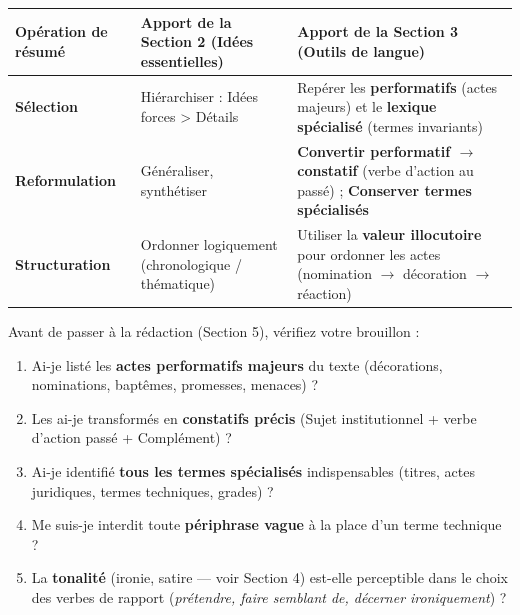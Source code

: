 \documentclass[11pt]{article}
\begin{document}
\begin{aretenir}
\begin{tabularx}{\linewidth}{|l|X|X|}
\hline
\rowcolor{popblueL} \textbf{Opération de résumé} & \textbf{Apport de la Section 2 (Idées essentielles)} & \textbf{Apport de la Section 3 (Outils de langue)} \\
\hline
\textbf{Sélection} & Hiérarchiser : Idées forces > Détails & Repérer les \textbf{performatifs} (actes majeurs) et le \textbf{lexique spécialisé} (termes invariants) \\
\hline
\textbf{Reformulation} & Généraliser, synthétiser & \textbf{Convertir performatif $\rightarrow$ constatif} (verbe d'action au passé) ; \textbf{Conserver termes spécialisés} \\
\hline
\textbf{Structuration} & Ordonner logiquement (chronologique / thématique) & Utiliser la \textbf{valeur illocutoire} pour ordonner les actes (nomination $\rightarrow$ décoration $\rightarrow$ réaction) \\
\hline
\end{tabularx}
\end{aretenir}

\begin{methode}
Avant de passer à la rédaction (Section 5), vérifiez votre brouillon :
\begin{enumerate}
    \item [$\square$] Ai-je listé les \textbf{actes performatifs majeurs} du texte (décorations, nominations, baptêmes, promesses, menaces) ?
    \item [$\square$] Les ai-je transformés en \textbf{constatifs précis} (Sujet institutionnel + verbe d'action passé + Complément) ?
    \item [$\square$] Ai-je identifié \textbf{tous les termes spécialisés} indispensables (titres, actes juridiques, termes techniques, grades) ?
    \item [$\square$] Me suis-je interdit toute \textbf{périphrase vague} à la place d'un terme technique ?
    \item [$\square$] La \textbf{tonalité} (ironie, satire — voir Section 4) est-elle perceptible dans le choix des verbes de rapport (\emph{prétendre, faire semblant de, décerner ironiquement}) ?
\end{enumerate}
\end{methode}
\end{document}
